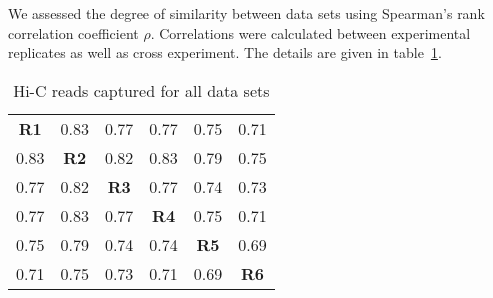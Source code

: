 We assessed the degree of similarity between data sets using Spearman's rank correlation coefficient $\rho$.  Correlations were calculated between experimental
replicates as well as cross experiment.  The details are given in table~\ref{tab:correlations}.

\begin{table}[ht]
  \centering
  \caption{Hi-C reads captured for all data sets}
  \label{tab:correlations}
  \begin{tabular}{cccccc}
    \toprule
    \textbf{R1} & 0.83 & 0.77 & 0.77 & 0.75 & 0.71 \\
    0.83 & \textbf{R2} & 0.82 & 0.83 & 0.79 & 0.75 \\
    0.77 & 0.82 & \textbf{R3} & 0.77 & 0.74 & 0.73 \\
    0.77 & 0.83 & 0.77 & \textbf{R4} & 0.75 & 0.71 \\
    0.75 & 0.79 & 0.74 & 0.74 & \textbf{R5} & 0.69 \\
    0.71 & 0.75 & 0.73 & 0.71 & 0.69 & \textbf{R6} \\
    \bottomrule
  \end{tabular}
\end{table}
